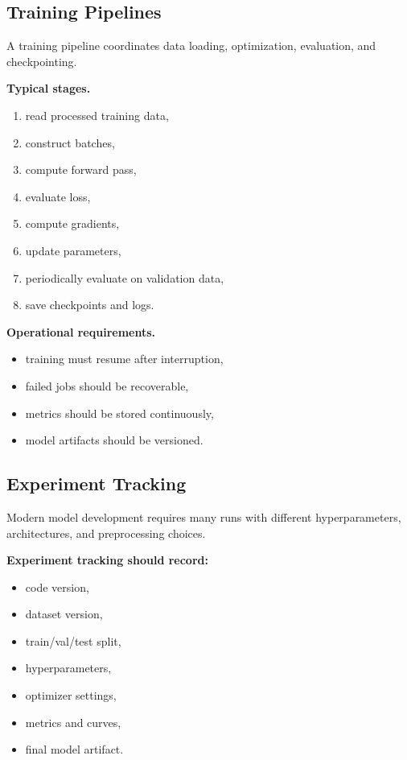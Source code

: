 \subsection{Training Pipelines}

A training pipeline coordinates data loading, optimization, evaluation, and checkpointing.

\medskip

\noindent
\textbf{Typical stages.}
\begin{enumerate}
    \item read processed training data,
    \item construct batches,
    \item compute forward pass,
    \item evaluate loss,
    \item compute gradients,
    \item update parameters,
    \item periodically evaluate on validation data,
    \item save checkpoints and logs.
\end{enumerate}

\medskip

\noindent
\textbf{Operational requirements.}
\begin{itemize}
    \item training must resume after interruption,
    \item failed jobs should be recoverable,
    \item metrics should be stored continuously,
    \item model artifacts should be versioned.
\end{itemize}

\subsection{Experiment Tracking}

Modern model development requires many runs with different hyperparameters, architectures, and preprocessing choices.

\medskip

\noindent
\textbf{Experiment tracking should record:}
\begin{itemize}
    \item code version,
    \item dataset version,
    \item train/val/test split,
    \item hyperparameters,
    \item optimizer settings,
    \item metrics and curves,
    \item final model artifact.
\end{itemize}

